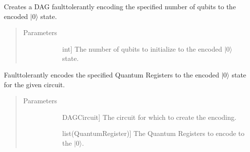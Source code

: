 \documentclass[letterpaper,10pt,english]{sphinxmanual}
\begin{document}
\begin{fulllineitems}
\begin{fulllineitems}
\label{\detokenize{Base:BaseFaultTolerance.FaultTolerantEncoder.createEncoderDag}}
\sphinxAtStartPar
Creates a DAG fault\sphinxhyphen{}tolerantly encoding the specified number of qubits to the encoded \(|0\rangle\) state.
\begin{quote}\begin{description}
\item[{Parameters}] \leavevmode\begin{description}
\item[{}] \leavevmode{[}int{]}
\sphinxAtStartPar
The number of qubits to initialize to the encoded \(|0\rangle\) state.

\end{description}

\end{description}\end{quote}

\end{fulllineitems}


\begin{fulllineitems}
\label{\detokenize{Base:BaseFaultTolerance.FaultTolerantEncoder.getEncoderCircuit}}
\sphinxAtStartPar
Fault\sphinxhyphen{}tolerantly encodes the specified Quantum Registers to the encoded \(|0\rangle\) state for the given circuit.
\begin{quote}\begin{description}
\item[{Parameters}] \leavevmode\begin{description}
\item[{}] \leavevmode{[}DAGCircuit{]}
\sphinxAtStartPar
The circuit for which to create the encoding.

\item[{}] \leavevmode{[}list(QuantumRegister){]}
\sphinxAtStartPar
The Quantum Registers to encode to the \(|0\rangle\).


\end{description}
\end{description}
\end{quote}
\end{fulllineitems}
\end{fulllineitems}
\end{document}
